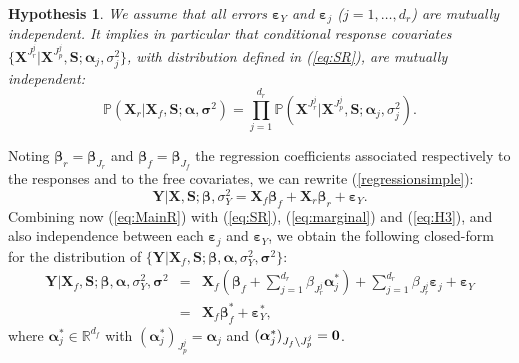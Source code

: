 \documentclass[12pt,a4paper]{report}
\newtheorem{hyp}{Hypothesis}
\begin{document}
\begin{hyp}\label{H3}
We assume that all errors $\boldsymbol{\varepsilon}_Y$ and $\boldsymbol{\varepsilon}_j$ ($j=1,\ldots,d_r$) are {\it mutually independent}. It implies in particular that conditional response covariates $\{\boldsymbol{X}^{J_{r}^j}|\boldsymbol{X}^{J_{p}^j},\boldsymbol{S};\boldsymbol{\alpha}_j,\sigma^2_j\}$, with distribution defined in (\ref{eq:SR}), are {\it mutually independent}:
\begin{equation}\label{eq:H3}
\mathbb{P}(\boldsymbol{X}_r | \boldsymbol{X}_f,\boldsymbol{S};\boldsymbol{\alpha},\boldsymbol{\sigma}^2) = \prod_{j=1}^{d_r} \mathbb{P}(\boldsymbol{X}^{J_{r}^j}|\boldsymbol{X}^{J_{p}^j},\boldsymbol{S};\boldsymbol{\alpha}_j,\sigma^2_j). 
\end{equation}
\end{hyp}

\vspace{3mm}

Noting $\boldsymbol{\beta}_r=\boldsymbol{\beta}_{J_r}$ and $\boldsymbol{\beta}_f=\boldsymbol{\beta}_{J_f}$ the regression coefficients associated respectively to the responses and to the free covariates, we can rewrite (\ref{regressionsimple}):
\begin{equation}
			\boldsymbol{Y}{|\boldsymbol{X},\boldsymbol{S}};\boldsymbol{\beta},\sigma_Y^2=\boldsymbol{X}_f\boldsymbol{\beta}_f+\boldsymbol{X}_r\boldsymbol{\beta}_r+\boldsymbol{\varepsilon}_Y. \label{eq:MainR}
\end{equation}
Combining now (\ref{eq:MainR}) with (\ref{eq:SR}), (\ref{eq:marginal}) and (\ref{eq:H3}), and also independence between each $\boldsymbol{\varepsilon}_j$ and $\boldsymbol{\varepsilon}_Y$, we obtain the following closed-form for the distribution of $\{\boldsymbol{Y} |\boldsymbol{X}_f,\boldsymbol{S};\boldsymbol{\beta},\boldsymbol{\alpha},\sigma_Y^2,\boldsymbol{\sigma}^2\}$:
\begin{eqnarray}
	\boldsymbol{Y}|\boldsymbol{X}_f,\boldsymbol{S};\boldsymbol{\beta},\boldsymbol{\alpha},\sigma_Y^2,\boldsymbol{\sigma}^2&=&\boldsymbol{X}_f (\boldsymbol{\beta}_f+ \sum_{j =1}^{d_r}\beta_{J_r^j}\boldsymbol{\alpha}_j^*)+  \sum_{j =1}^{d_r}\beta_{J_r^j}\boldsymbol{\varepsilon}_j+\boldsymbol{\varepsilon}_Y \label{eq:Trueexpl} \\
	&=&\boldsymbol{X}_f\boldsymbol{\beta}_f^*+\boldsymbol{\varepsilon}_Y^*,\label{eq:modexpl}
\end{eqnarray}
where $\boldsymbol{\alpha}^*_j \in \mathbb{R}^{d_f}$ with $(\boldsymbol{\alpha}_j^*)_{J_p^j}=\boldsymbol{\alpha}_j $ and $(\boldsymbol{\alpha}_j^*)_{J_f\setminus J_p^j}=\bf 0  $. \\
\end{document}
